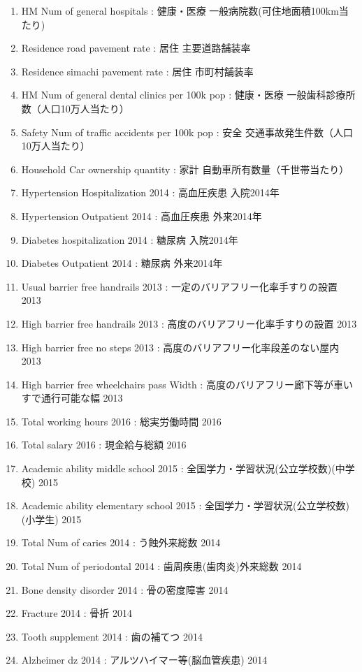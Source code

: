 \begin{enumerate}
  \item   HM Num of general hospitals  :   健康・医療 一般病院数(可住地面積100km当たり)
  \item   Residence road pavement rate  :   居住 主要道路舗装率
  \item   Residence simachi pavement rate  :   居住 市町村舗装率
  \item   HM Num of general dental clinics per 100k pop  :   健康・医療 一般歯科診療所数（人口10万人当たり）
  \item   Safety Num of traffic accidents per 100k pop  :   安全 交通事故発生件数（人口10万人当たり）
  \item   Household Car ownership quantity  :   家計 自動車所有数量（千世帯当たり）
  \item   Hypertension Hospitalization 2014  :   高血圧疾患 入院2014年
  \item   Hypertension Outpatient 2014  :   高血圧疾患 外来2014年
  \item   Diabetes hospitalization 2014  :   糖尿病 入院2014年
  \item   Diabetes Outpatient 2014  :   糖尿病 外来2014年
  \item   Usual barrier free handrails 2013  :   一定のバリアフリー化率手すりの設置 2013
  \item   High barrier free handrails 2013  :   高度のバリアフリー化率手すりの設置 2013
  \item   High barrier free no steps 2013  :   高度のバリアフリー化率段差のない屋内 2013
  \item   High barrier free wheelchairs pass Width  :   高度のバリアフリー廊下等が車いすで通行可能な幅 2013
  \item   Total working hours 2016  :   総実労働時間 2016
  \item   Total salary 2016  :   現金給与総額 2016
  \item   Academic ability middle school 2015  :   全国学力・学習状況(公立学校数)(中学校) 2015
  \item   Academic ability elementary school 2015  :   全国学力・学習状況(公立学校数)(小学生) 2015
  \item   Total Num of caries 2014  :   う蝕外来総数 2014
  \item   Total Num of periodontal 2014  :   歯周疾患(歯肉炎)外来総数 2014
  \item   Bone density disorder 2014  :   骨の密度障害 2014
  \item   Fracture 2014  :   骨折 2014
  \item   Tooth supplement 2014  :   歯の補てつ 2014
  \item   Alzheimer dz 2014  :   アルツハイマー等(脳血管疾患) 2014

\end{enumerate}




